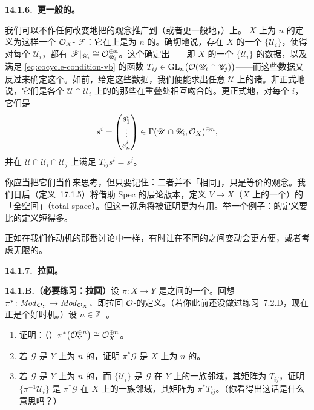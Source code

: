 \textbf{14.1.6.\ 更一般的\trLocallyFreeSheaf。}

我们可以不作任何改变地把\trLocallyFreeSheaf{}的观念推广到\trScheme（或者更一般地，\trRingedSpace）上。\trScheme{} $X$ 上\trRank{}为 $n$ 的\trLocallyFreeSheaf{}定义为这样一个 $\mathcal{O}_X$-\trModule{} $\mathscr{F}$：它在\trLocally{}上是\trRank{}为 $n$ 的\trFreeSheaf。确切地说，存在 $X$ 的一个\trOpenCover{} $\{\mathscr{U}_i\}$，使得对每个 $\mathscr{U}_i$，都有 $\mathscr{F}\vert_{\mathscr{U}_i}\cong\mathcal{O}_{\mathscr{U}_i}^{\oplus n}$。这个\trOpenCover{}确定出\trTransitionFunction——即 $X$ 的一个\trCover{} $\{\mathscr{U}_i\}$ 的数据，以及满足\trCocycleCondition{} \eqref{eq:cocycle-condition-vb} 的函数 $T_{ij}\in\mathrm{GL}_n\bigl(\mathcal{O}(\mathscr{U}_i\cap\mathscr{U}_j)\bigr)$——而这些数据又反过来确定这个\trLocallyFreeSheaf。如前，给定这些数据，我们便能求出任意\trOpenSet{} $\mathscr{U}$ 上的诸\trSection。非正式地说，它们是各个 $\mathscr{U}\cap\mathscr{U}_i$ 上的\trFreeSheaf{}的那些在重叠处相互吻合的\trSection。更正式地，对每个 $i$，它们是
\[
s^i=\begin{pmatrix}s^i_1\\ \vdots\\ s^i_n\end{pmatrix}\in\Gamma(\mathscr{U}\cap\mathscr{U}_i,\mathcal{O}_X)^{\oplus n},
\]
并在 $\mathscr{U}\cap\mathscr{U}_i\cap\mathscr{U}_j$ 上满足 $T_{ij}s^i=s^j$。

你应当把它们当作\trVectorBundle{}来思考，但只要记住：二者并不「相同」，只是等价的观念。我们日后（定义~17.1.5）将借助 Spec 的层论版本，定义\trVectorBundle{} $V\to X$（$X$ 上的一个\trScheme）的「全空间」（total space）。但\trLocallyFreeSheaf{}这一视角将被证明更为有用。举一个例子：\trLocallyFreeSheaf{}的定义要比\trVectorBundle{}的定义短得多。

正如在我们作动机的那番讨论中一样，有时让\trRank{}在不同的\trConnectedComponent{}之间变动会更方便，或者考虑无限\trRank{}的\trLocallyFreeSheaf。

\textbf{14.1.7.\ 拉回\trVectorBundle。}

\textbf{14.1.B.（必要练习：拉回\trVectorBundle）}\quad 设 $\pi\colon X\to Y$ 是\trRingedSpace{}之间的一个\trMorphism。回想 $\pi^*\colon\mathit{Mod}_{\mathcal{O}_Y}\to\mathit{Mod}_{\mathcal{O}_X}$、即拉回 $\mathcal{O}$-\trModule{}的定义。（若你此前还没做过\mbox{练习~7.2.D}，现在正是个好时机。）设 $n\in\mathbb{Z}^{+}$。
\begin{enumerate}[label=(\alph*)]
\item 证明：（\trCanonically{}）$\pi^*\bigl(\mathcal{O}_Y^{\oplus n}\bigr)\cong\mathcal{O}_X^{\oplus n}$。
\item 若 $\mathscr{G}$ 是 $Y$ 上\trRank{}为 $n$ 的\trLocallyFreeSheaf，证明 $\pi^*\mathscr{G}$ 是 $X$ 上\trRank{}为 $n$ 的\trLocallyFreeSheaf。
\item 若 $\mathscr{G}$ 是 $Y$ 上\trRank{}为 $n$ 的\trLocallyFreeSheaf，而 $\{\mathscr{U}_i\}$ 是 $\mathscr{G}$ 在 $Y$ 上的一族\trTrivialization{}邻域，其\trTransitionFunction{}矩阵为 $T_{ij}$，证明 $\{\pi^{-1}\mathscr{U}_i\}$ 是 $\pi^*\mathscr{G}$ 在 $X$ 上的一族\trTrivialization{}邻域，其\trTransitionFunction{}矩阵为 $\pi^*T_{ij}$。（你看得出这话是什么意思吗？）
\end{enumerate}

